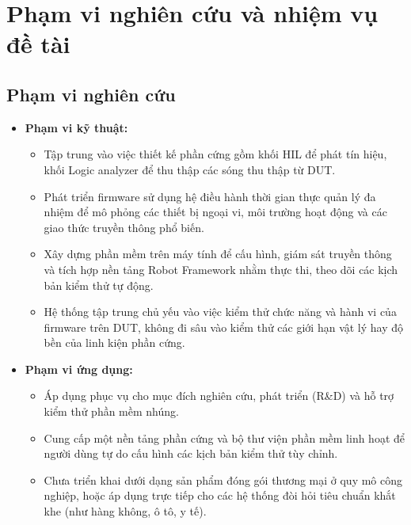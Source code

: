 \section{Phạm vi nghiên cứu và nhiệm vụ đề tài}
\subsection{Phạm vi nghiên cứu}
\begin{itemize}
    \item \textbf{Phạm vi kỹ thuật:}
    \begin{itemize}
        \item[-] Tập trung vào việc thiết kế phần cứng gồm khối HIL để phát tín hiệu, khối Logic analyzer để thu thập các sóng thu thập từ DUT.
        \item[-] Phát triển firmware sử dụng hệ điều hành thời gian thực quản lý đa nhiệm để mô phỏng các thiết bị ngoại vi, môi trường hoạt động và các giao thức truyền thông phổ biến.
        \item[-] Xây dựng phần mềm trên máy tính để cấu hình, giám sát truyền thông và tích hợp nền tảng Robot Framework nhằm thực thi, theo dõi các kịch bản kiểm thử tự động.
        \item[-] Hệ thống tập trung chủ yếu vào việc kiểm thử chức năng và hành vi của firmware trên DUT, không đi sâu vào kiểm thử các giới hạn vật lý hay độ bền của linh kiện phần cứng.
    \end{itemize}

    \item \textbf{Phạm vi ứng dụng:}
    \begin{itemize}
        \item[-] Áp dụng phục vụ cho mục đích nghiên cứu, phát triển (R\&D) và hỗ trợ kiểm thử phần mềm nhúng.
        \item[-] Cung cấp một nền tảng phần cứng và bộ thư viện phần mềm linh hoạt để người dùng tự do cấu hình các kịch bản kiểm thử tùy chỉnh.
        \item[-] Chưa triển khai dưới dạng sản phẩm đóng gói thương mại ở quy mô công nghiệp, hoặc áp dụng trực tiếp cho các hệ thống đòi hỏi tiêu chuẩn khắt khe (như hàng không, ô tô, y tế).
    \end{itemize}
\end{itemize}


